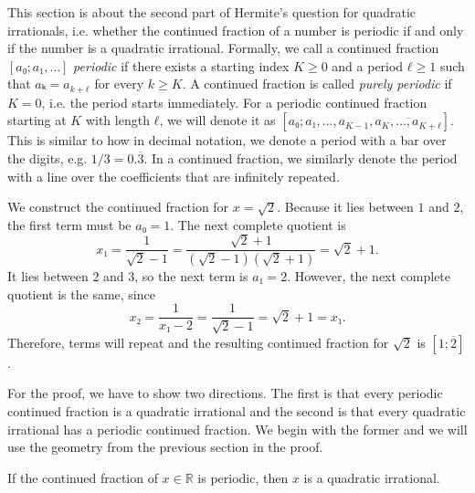 This section is about the second part of Hermite's question for quadratic
irrationals, i.e. whether the continued fraction of a number is periodic if and only
if the number is a quadratic irrational.
Formally, we call a continued fraction $[a₀; a₁, …]$ \emph{periodic}
if there exists a starting index $K ≥ 0$ and a period $ℓ ≥ 1$ such that $aₖ = a_{k+ℓ}$ for every $k ≥ K$.
A continued fraction is called \emph{purely periodic} if $K = 0$,
i.e. the period starts immediately.
For a periodic continued fraction starting at $K$ with length $ℓ$,
we will denote it as $[a₀; a₁, …, a_{K-1}, \overline{a_K, …, a_{K+ℓ}}]$.
This is similar to how in decimal notation, we denote a period with a bar over the digits,
e.g. $1/3 = 0.\overline{3}$.
In a continued fraction, we similarly denote the period with a line over the
coefficients that are infinitely repeated.

\begin{example}
  We construct the continued fraction for $x = \sqrt{2}$.
  Because it lies between $1$ and $2$, the first term must be $a₀ = 1$.
  The next complete quotient is
  \[
    x₁ = \frac{1}{\sqrt{2} - 1} = \frac{\sqrt{2} + 1}{(\sqrt{2} - 1)(\sqrt{2} + 1)} = \sqrt{2} + 1.
  \]
  It lies between $2$ and $3$,
  so the next term is $a₁ = 2$.
  However, the next complete quotient is the same, since
  \[
    x₂ = \frac{1}{x₁ - 2} = \frac{1}{\sqrt{2} - 1} = \sqrt{2} + 1 = x₁.
  \]
  Therefore, terms will repeat and the resulting continued fraction for $\sqrt{2}$ is $[1; \overline{2}]$.
\end{example}

For the proof, we have to show two directions.
The first is that every periodic continued fraction is a quadratic irrational
and the second is that every quadratic irrational has a periodic continued fraction.
We begin with the former and we will use the geometry from the previous section
in the proof.

\begin{theorem}
  If the continued fraction of $x ∈ ℝ$ is periodic, then $x$ is a quadratic irrational.
\end{theorem}

